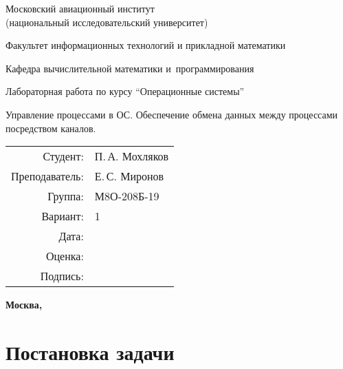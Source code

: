 \documentclass[pdf, unicode, 12pt, a4paper,oneside,fleqn]{article}
\begin{document}
\begin{titlepage}
    \begin{center}
        \bfseries

        {\Large Московский авиационный институт\\ (национальный исследовательский университет)}
        
        \vspace{48pt}
        
        {\large Факультет информационных технологий и прикладной математики}
        
        \vspace{36pt}
        
        {\large Кафедра вычислительной математики и~программирования}
        
        \vspace{48pt}
        
        Лабораторная работа  по курсу \enquote{Операционные системы}

        \vspace{48pt}

        Управление процессами в ОС. Обеспечение обмена данных между процессами посредством каналов.
    \end{center}
    
    \vspace{140pt}
    
    \begin{flushright}
    \begin{tabular}{rl}
    Студент: & П.\,А. Мохляков \\
    Преподаватель: & Е.\,С. Миронов \\
    Группа: & М8О-208Б-19 \\
    Вариант: & 1 \\
    Дата: & \\
    Оценка: & \\
    Подпись: & \\
    \end{tabular}
    \end{flushright}
    
    \vfill
    
    \begin{center}
    \bfseries
    Москва, \the\year
    \end{center}
\end{titlepage}
    
\pagebreak

\section{Постановка задачи}
\end{document}
